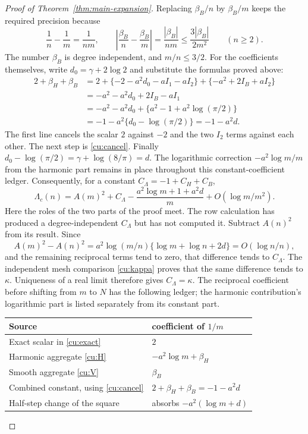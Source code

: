 \begin{proof}[Proof of Theorem~\ref{thm:main-expansion}]
Replacing $\beta_B/n$ by $\beta_B/m$ keeps the required precision because
\[
 \frac1n-\frac1m=\frac1{nm},\qquad
 \left|\frac{\beta_B}{n}-\frac{\beta_B}{m}\right|
 =\frac{|\beta_B|}{nm}\leq\frac{3|\beta_B|}{2m^2}
                                      \qquad(n\geq2).
\]
The number $\beta_B$ is degree independent, and $m/n\leq3/2$.
For the coefficients themselves, write $d_0=\gamma+2\log2$
and substitute the formulas proved above:
\[
 \begin{aligned}
 2+\beta_H+\beta_B
 &=2+\{-2-a^2d_0-aI_1-aI_2\}
                   +\{-a^2+2I_B+aI_2\}\\
 &=-a^2-a^2d_0+2I_B-aI_1\\
 &=-a^2-a^2d_0+\{a^2-1+a^2\log(\pi/2)\}\\
 &=-1-a^2\{d_0-\log(\pi/2)\}=-1-a^2d.
 \end{aligned}
\]
The first line cancels the scalar $2$ against $-2$ and the
two $I_2$ terms against each other. The next step is
\eqref{cu:cancel}. Finally
$d_0-\log(\pi/2)=\gamma+\log(8/\pi)=d$.
The logarithmic correction $-a^2\log m/m$ from the harmonic
part remains in place throughout this constant-coefficient ledger.
Consequently, for a constant $C_\Lambda=-1+C_H+C_B$,
\[
 \Lambda_c(n)=A(m)^2+C_\Lambda-
       \frac{a^2\log m+1+a^2d}{m}+O(\log m/m^2).
\]
Here the roles of the two parts of the proof meet. The row
calculation has produced a degree-independent $C_\Lambda$ but has not
computed it. Subtract $A(n)^2$ from its result. Since
\[
 A(m)^2-A(n)^2
  =a^2\log(m/n)\{\log m+\log n+2d\}
                         =O(\log n/n),
\]
and the remaining reciprocal terms tend to zero, that difference
tends to $C_\Lambda$. The independent mesh comparison \eqref{cu:kappa}
proves that the same difference tends to $\kappa$. Uniqueness of a real limit
therefore gives $C_\Lambda=\kappa$.
The reciprocal coefficient before shifting from $m$ to $N$ has the
following ledger; the harmonic contribution's logarithmic part is listed
separately from its constant part.
\begin{center}
\begin{tabular}{ll}
\toprule
Source & coefficient of $1/m$\\
\midrule
Exact scalar in \eqref{cu:exact} & $2$\\
Harmonic aggregate \eqref{cu:H} & $-a^2\log m+\beta_H$\\
Smooth aggregate \eqref{cu:V} & $\beta_B$\\
Combined constant, using \eqref{cu:cancel} & $2+\beta_H+\beta_B=-1-a^2d$\\
Half-step change of the square & absorbs $-a^2(\log m+d)$\\

\end{tabular}
\end{center}
\end{proof}
